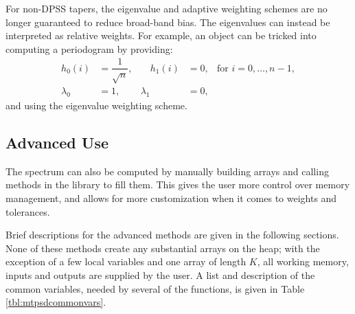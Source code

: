 For non-DPSS tapers, the eigenvalue and adaptive weighting schemes are no longer guaranteed to reduce broad-band bias.  The eigenvalues can instead be interpreted as relative weights.  For example, an  object can be tricked into computing a periodogram by providing:
\begin{align*}
    h_0(i) & =\dfrac{1}{\sqrt{n}}, & \quad h_1(i)& =0, & \text{for } i=0,\ldots,n-1,\\
    \lambda_0 &=1, & \lambda_1 &=0,
\end{align*}
and using the eigenvalue weighting scheme. 

\subsection{Advanced Use \label{sec:advanced}}

The spectrum can also be computed by manually building arrays and calling methods in the  library to fill them.  This gives the user more control over memory management, and allows for more customization when it comes to weights and tolerances.

Brief descriptions for the advanced methods are given in the following sections.  None of these methods create any substantial arrays on the heap; with the exception of a few local variables and one array of length $K$, all working memory, inputs and outputs are supplied by the user.  A list and description of the common variables, needed by several of the functions, is given in Table \ref{tbl:mtpsdcommonvars}.
\bigskip

